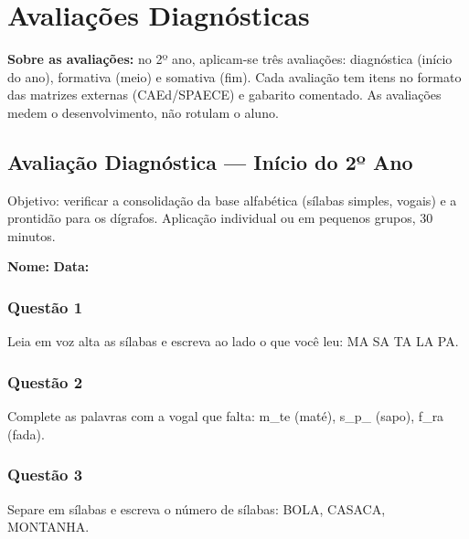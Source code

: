 
\chapter{Avaliações Diagnósticas}

\textbf{Sobre as avaliações:} no 2º ano, aplicam-se três avaliações: diagnóstica (início do ano), formativa (meio) e somativa (fim). Cada avaliação tem itens no formato das matrizes externas (CAEd/SPAECE) e gabarito comentado. As avaliações medem o desenvolvimento, não rotulam o aluno.

\section{Avaliação Diagnóstica — Início do 2º Ano}

\begin{avaliacao}
Objetivo: verificar a consolidação da base alfabética (sílabas simples, vogais) e a prontidão para os dígrafos. Aplicação individual ou em pequenos grupos, 30 minutos.
\end{avaliacao}

\noindent\textbf{Nome:} \underline{\hspace{4cm}} \quad \textbf{Data:} \underline{\hspace{2cm}}

\subsection*{Questão 1}
Leia em voz alta as sílabas e escreva ao lado o que você leu: MA  SA  TA  LA  PA.

\begin{center}
  \underline{\hspace{12cm}}
\end{center}

\subsection*{Questão 2}
Complete as palavras com a vogal que falta: m\_te (maté), s\_p\_ (sapo), f\_ra (fada).

\begin{center}
  \underline{\hspace{12cm}}
\end{center}

\subsection*{Questão 3}
Separe em sílabas e escreva o número de sílabas: BOLA, CASACA, MONTANHA.

